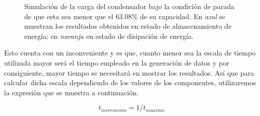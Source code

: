 \documentclass[../main.tex]{subfiles}
\begin{document}
\begin{figure}[!h]
    \centering
    \quad


    \caption{Simulación de la carga del condensador bajo la condición de parada de que esta sea menor que el 63.08\% de su capacidad. En \textit{azul} se muestran los resultados obtenidos en estado de almacenamiento de energía; en \textit{naranja} en estado de disipación de energía.}

    \label{fig::condiciones-de-parada}
\end{figure}



Esto cuenta con un inconveniente y es que, cuanto menor sea la escala de tiempo utilizada mayor será el tiempo empleado en la generación de datos y por consiguiente, mayor tiempo se necesitará en mostrar los resultados. Así que para calcular dicha escala dependiendo de los valores de los componentes, utilizaremos la expresión que se muestra a continuación.

\begin{equation}
    t_{incremento} = 1 / t_{maximo}
    \label{eqq::tincremento}
\end{equation}
\end{document}
